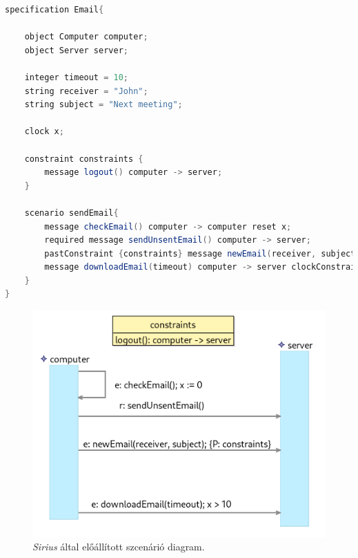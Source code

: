 \begin{lstlisting}[language=java, frame=single, float=ht!, caption={Szcenárió szöveges leírása.},captionpos=b, label=sirius_tpsc_text]
specification Email{

    object Computer computer;
    object Server server;

    integer timeout = 10;
    string receiver = "John";
    string subject = "Next meeting";

    clock x;

    constraint constraints {
        message logout() computer -> server;
    }

    scenario sendEmail{
        message checkEmail() computer -> computer reset x;
        required message sendUnsentEmail() computer -> server;
        pastConstraint {constraints} message newEmail(receiver, subject) computer -> server;
        message downloadEmail(timeout) computer -> server clockConstraint {>(x,10)};
    }
}
\end{lstlisting}

\begin{figure}[!ht]
    \centering
    \includegraphics[width=150mm, keepaspectratio]{figures/diagramExample.png}
    \caption{\textit{Sirius} által előállított szcenárió diagram.}
    \label{sirius_diagram}
\end{figure}

